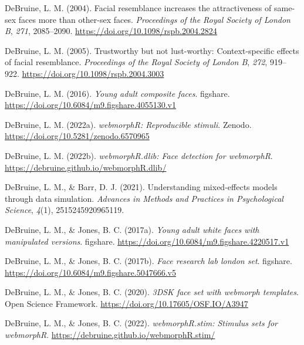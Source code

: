 \documentclass[
  doc,floatsintext]{apa6}
\newlength{\cslhangindent}
\newlength{\cslentryspacingunit} %
\newenvironment{CSLReferences}[2] %
 {%
  \setlength{\parindent}{0pt}
  \ifodd #1
  \let\oldpar\par
  \def\par{\hangindent=\cslhangindent\oldpar}
  \fi
  \setlength{\parskip}{#2\cslentryspacingunit}
 }%
 {}
\begin{document}
\begin{CSLReferences}{1}{0}
\leavevmode{}%
DeBruine, L. M. (2004). Facial resemblance increases the attractiveness of same-sex faces more than other-sex faces. \emph{Proceedings of the Royal Society of London B}, \emph{271}, 2085--2090. \url{https://doi.org/10.1098/rspb.2004.2824}

\leavevmode{}%
DeBruine, L. M. (2005). Trustworthy but not lust-worthy: Context-specific effects of facial resemblance. \emph{Proceedings of the Royal Society of London B}, \emph{272}, 919--922. \url{https://doi.org/10.1098/rspb.2004.3003}

\leavevmode{}%
DeBruine, L. M. (2016). \emph{Young adult composite faces}. figshare. \url{https://doi.org/10.6084/m9.figshare.4055130.v1}

\leavevmode{}%
DeBruine, L. M. (2022a). \emph{{webmorphR}: Reproducible stimuli}. Zenodo. \url{https://doi.org/10.5281/zenodo.6570965}

\leavevmode{}%
DeBruine, L. M. (2022b). \emph{{webmorphR.dlib}: Face detection for webmorphR}. \url{https://debruine.github.io/webmorphR.dlib/}

\leavevmode{}%
DeBruine, L. M., \& Barr, D. J. (2021). Understanding mixed-effects models through data simulation. \emph{Advances in Methods and Practices in Psychological Science}, \emph{4}(1), 2515245920965119.

\leavevmode{}%
DeBruine, L. M., \& Jones, B. C. (2017a). \emph{Young adult white faces with manipulated versions}. figshare. \url{https://doi.org/10.6084/m9.figshare.4220517.v1}

\leavevmode{}%
DeBruine, L. M., \& Jones, B. C. (2017b). \emph{Face research lab london set}. figshare. \url{https://doi.org/10.6084/m9.figshare.5047666.v5}

\leavevmode{}%
DeBruine, L. M., \& Jones, B. C. (2020). \emph{3DSK face set with webmorph templates}. Open Science Framework. \url{https://doi.org/10.17605/OSF.IO/A3947}

\leavevmode{}%
DeBruine, L. M., \& Jones, B. C. (2022). \emph{{webmorphR.stim}: Stimulus sets for webmorphR}. \url{https://debruine.github.io/webmorphR.stim/}


\end{CSLReferences}
\end{document}
